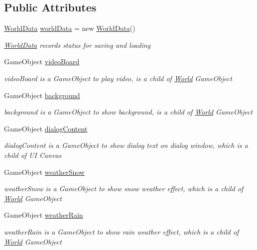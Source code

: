 \subsection*{Public Attributes}
\begin{DoxyCompactItemize}
\item 
\hyperlink{classdoki_unity_1_1_world_data}{World\+Data} \hyperlink{classdoki_unity_1_1_world_a3e521b89596af805bc18166709368d7e}{world\+Data} = new \hyperlink{classdoki_unity_1_1_world_data}{World\+Data}()
\begin{DoxyCompactList}\small\item\em \hyperlink{classdoki_unity_1_1_world_data}{World\+Data} records status for saving and loading \end{DoxyCompactList}\item 
Game\+Object \hyperlink{classdoki_unity_1_1_world_a5d48c7ea4c8d189f35d8ee8a5b6b320d}{video\+Board}
\begin{DoxyCompactList}\small\item\em video\+Board is a Game\+Object to play video, is a child of \hyperlink{classdoki_unity_1_1_world}{World} Game\+Object \end{DoxyCompactList}\item 
Game\+Object \hyperlink{classdoki_unity_1_1_world_a78f3a46c12e0272fcd356c1501fa6a86}{background}
\begin{DoxyCompactList}\small\item\em background is a Game\+Object to show background, is a child of \hyperlink{classdoki_unity_1_1_world}{World} Game\+Object \end{DoxyCompactList}\item 
Game\+Object \hyperlink{classdoki_unity_1_1_world_a2ced8f095679e05f01ba5781f67015e5}{dialog\+Content}
\begin{DoxyCompactList}\small\item\em dialog\+Content is a Game\+Object to show dialog text on dialog window, which is a child of UI Canvas \end{DoxyCompactList}\item 
Game\+Object \hyperlink{classdoki_unity_1_1_world_a6e987903e3c1bdd1884076bf058fc15d}{weather\+Snow}
\begin{DoxyCompactList}\small\item\em weather\+Snow is a Game\+Object to show snow weather effect, which is a child of \hyperlink{classdoki_unity_1_1_world}{World} Game\+Object \end{DoxyCompactList}\item 
Game\+Object \hyperlink{classdoki_unity_1_1_world_ac49a0f2e620b31eb86a38adac5c99ac8}{weather\+Rain}
\begin{DoxyCompactList}\small\item\em weather\+Rain is a Game\+Object to show rain weather effect, which is a child of \hyperlink{classdoki_unity_1_1_world}{World} Game\+Object \end{DoxyCompactList}\end{DoxyCompactItemize}


